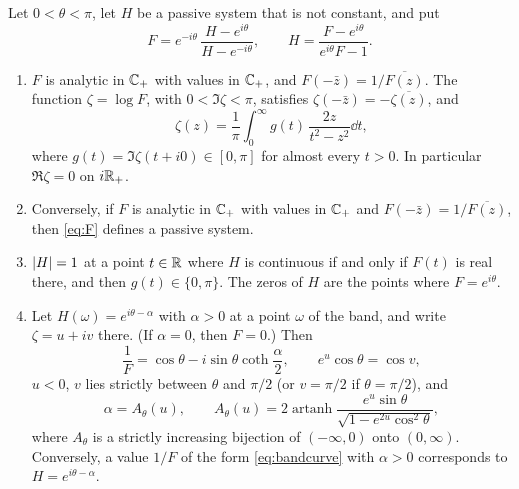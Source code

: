\begin{lemma}\label{lem:transform}
Let $0<\theta<\pi$, let $H$ be a passive system that is not constant, and
put
\begin{equation}\label{eq:F}
F=e^{-i\theta}\,\frac{H-e^{i\theta}}{H-e^{-i\theta}},\qquad
H=\frac{F-e^{i\theta}}{e^{i\theta}F-1}.
\end{equation}
\begin{enumerate}
\item[(i)] $F$ is analytic in $\mathbb C_{+}$ with values in $\mathbb C_{+}$, and
$F(-\bar z)=1/\overline{F(z)}$. The function $\zeta=\log F$, with
$0<\Im\zeta<\pi$, satisfies $\zeta(-\bar z)=-\overline{\zeta(z)}$, and
\begin{equation}\label{eq:zetarep}
\zeta(z)=\frac1\pi\int_0^\infty g(t)\,\frac{2z}{t^2-z^2}\dd t ,
\end{equation}
where $g(t)=\Im\zeta(t+i0)\in[0,\pi]$ for almost every $t>0$. In
particular $\Re\zeta=0$ on $i\mathbb R_+$.
\item[(ii)] Conversely, if $F$ is analytic in $\mathbb C_{+}$ with values in $\mathbb C_{+}$ and
$F(-\bar z)=1/\overline{F(z)}$, then \eqref{eq:F} defines a passive system.
\item[(iii)] $\left|H\right|=1$ at a point $t\in\mathbb R$ where $H$ is continuous if and
only if $F(t)$ is real there, and then $g(t)\in\{0,\pi\}$. The zeros of $H$
are the points where $F=e^{i\theta}$.
\item[(iv)] Let $H(\omega)=e^{i\theta-\alpha}$ with $\alpha>0$ at a point
$\omega$ of the band, and write $\zeta=u+iv$ there. (If $\alpha=0$, then $F=0$.)
Then
\begin{equation}\label{eq:bandcurve}
\frac1F=\cos\theta-i\sin\theta\coth\frac\alpha2,\qquad
e^u\cos\theta=\cos v,
\end{equation}
$u<0$, $v$ lies strictly between $\theta$ and $\pi/2$ (or $v=\pi/2$ if
$\theta=\pi/2$), and
\begin{equation}\label{eq:Au}
\alpha=A_\theta(u),\qquad
A_\theta(u)=2\operatorname{artanh}\frac{e^u\sin\theta}{\sqrt{1-e^{2u}\cos^2\theta}},
\end{equation}
where $A_\theta$ is a strictly increasing bijection of $(-\infty,0)$ onto
$(0,\infty)$. Conversely, a value $1/F$ of the form \eqref{eq:bandcurve}
with $\alpha>0$ corresponds to $H=e^{i\theta-\alpha}$.
\end{enumerate}
\end{lemma}

